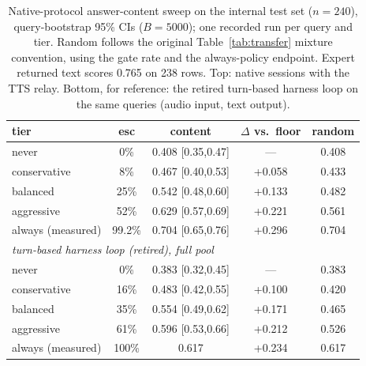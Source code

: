 \begin{table}[h]
\centering\small
\caption{Native-protocol answer-content sweep on the internal test set
($n{=}240$), query-bootstrap 95\% CIs ($B{=}5000$); one recorded run
per query and tier. Random follows the original Table~\ref{tab:transfer} mixture
convention, using the gate rate and the always-policy endpoint. Expert returned text scores 0.765 on 238 rows.
Top: native sessions with the TTS relay.
Bottom, for reference: the retired turn-based harness loop on the
same queries (audio input, text output).}
\label{tab:live}
\begin{tabular}{lcccc}
\toprule
tier & esc & content & $\Delta$ vs.\ floor & random \\
\midrule
never & 0\%  & 0.408 [0.35,0.47] & --- & 0.408 \\
conservative  & 8\% & 0.467 [0.40,0.53] & +0.058 & 0.433 \\
balanced      & 25\% & 0.542 [0.48,0.60] & +0.133 & 0.482 \\
aggressive    & 52\% & 0.629 [0.57,0.69] & +0.221 & 0.561 \\
always (measured) & 99.2\% & 0.704 [0.65,0.76] & +0.296 & 0.704 \\
\midrule
\multicolumn{5}{l}{\emph{turn-based harness loop (retired), full pool}} \\
never & 0\%  & 0.383 [0.32,0.45] & --- & 0.383 \\
conservative  & 16\% & 0.483 [0.42,0.55] & +0.100 & 0.420 \\
balanced      & 35\% & 0.554 [0.49,0.62] & +0.171 & 0.465 \\
aggressive    & 61\% & 0.596 [0.53,0.66] & +0.212 & 0.526 \\
always (measured) & 100\% & 0.617 & +0.234 & 0.617 \\
\bottomrule
\end{tabular}
\end{table}


